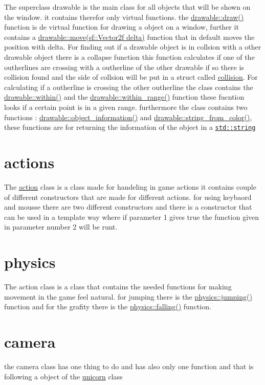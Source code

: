 The superclass drawable is the main class for all objects that will be shown on the window. it contains therefor only virtual functions. the \hyperlink{classdrawable_a4e49e2c1121704c83ce24c5f48dd910f}{drawable\+::draw()} function is de virtual function for drawing a object on a window, further it contains a \hyperlink{classdrawable_ad0d3930c045cc6776aa2c3965be32491}{drawable\+::move(sf\+::\+Vector2f delta)} function that in default moves the position with delta. For finding out if a drawable object is in collsion with a other drawable object there is a collapse function this function calculates if one of the outherlines are crossing with a outherline of the other drawable if so there is collision found and the side of collsion will be put in a struct called \hyperlink{structcollision}{collision}. For calculating if a outherline is crossing the other outherline the class contains the \hyperlink{classdrawable_a0d3278e4e888fc8289468e8893dd8329}{drawable\+::within()} and the \hyperlink{classdrawable_ab5c0e1af885f214bc9ef0da47cdb5ac9}{drawable\+::within\+\_\+range()} function these fucntion looks if a certain point is in a given range. furthermore the class contains two functions \+: \hyperlink{classdrawable_a2ed0f8bb53f33477f7722efa7bb24583}{drawable\+::object\+\_\+information()} and \hyperlink{classdrawable_add3d8569fe2616ae0ed503b19c92c08e}{drawable\+::string\+\_\+from\+\_\+color()}, these functions are for returning the information of the object in a \href{http://www.cplusplus.com/reference/string/string/string/}{\tt std\+::string}\hypertarget{index_actions}{}\section{actions}\label{index_actions}
The \hyperlink{classaction}{action} class is a class made for handeling in game actions it contains couple of different constructors that are made for different actions. for using keybaord and mousse there are two different constructors and there is a constructor that can be used in a template way where if parameter 1 gives true the function given in parameter number 2 will be runt.\hypertarget{index_physics}{}\section{physics}\label{index_physics}
The action class is a class that contains the needed functions for making movement in the game feel natural. for jumping there is the \hyperlink{classphysics_aaf1c57aa6e35b9c83ccbfdfa8c18468c}{physics\+::jumping()} function and for the grafity there is the \hyperlink{classphysics_acca1ee2fb8b760b6e4ee61ae7c2ee3da}{physics\+::falling()} function.\hypertarget{index_camera}{}\section{camera}\label{index_camera}
the camera class has one thing to do and has also only one function and that is following a object of the \hyperlink{classunicorn}{unicorn} class 